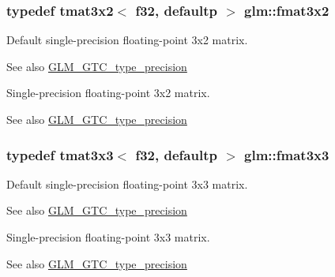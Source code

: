 \subsubsection[{fmat3x2}]{\setlength{\rightskip}{0pt plus 5cm}typedef tmat3x2$<$ f32, defaultp $>$ {\bf glm\+::fmat3x2}}\label{group__gtc__type__precision_gab194ac1a68dbcb228384112ebe531c67}
Default single-\/precision floating-\/point 3x2 matrix. \begin{DoxySeeAlso}{See also}
\hyperlink{group__gtc__type__precision}{G\+L\+M\+\_\+\+G\+T\+C\+\_\+type\+\_\+precision}
\end{DoxySeeAlso}
Single-\/precision floating-\/point 3x2 matrix. \begin{DoxySeeAlso}{See also}
\hyperlink{group__gtc__type__precision}{G\+L\+M\+\_\+\+G\+T\+C\+\_\+type\+\_\+precision} 
\end{DoxySeeAlso}
\hypertarget{group__gtc__type__precision_ga577209f19554f5291cc3d66dda9a4388}{}
\subsubsection[{fmat3x3}]{\setlength{\rightskip}{0pt plus 5cm}typedef tmat3x3$<$ f32, defaultp $>$ {\bf glm\+::fmat3x3}}\label{group__gtc__type__precision_ga577209f19554f5291cc3d66dda9a4388}
Default single-\/precision floating-\/point 3x3 matrix. \begin{DoxySeeAlso}{See also}
\hyperlink{group__gtc__type__precision}{G\+L\+M\+\_\+\+G\+T\+C\+\_\+type\+\_\+precision}
\end{DoxySeeAlso}
Single-\/precision floating-\/point 3x3 matrix. \begin{DoxySeeAlso}{See also}
\hyperlink{group__gtc__type__precision}{G\+L\+M\+\_\+\+G\+T\+C\+\_\+type\+\_\+precision} 
\end{DoxySeeAlso}
\hypertarget{group__gtc__type__precision_gad68d9daa91ef05b29e80e044931837cf}{}
